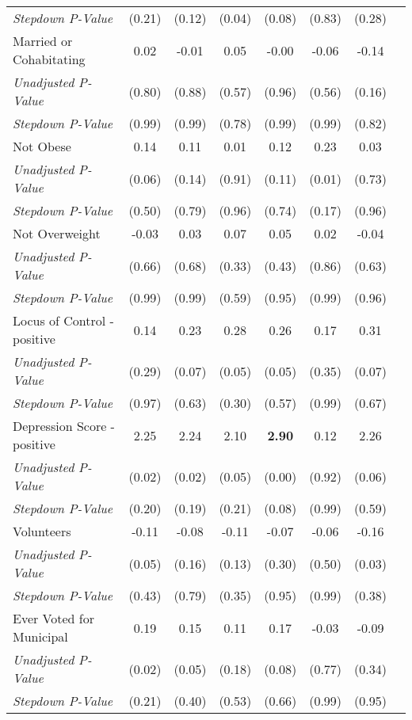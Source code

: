 \begin{tabular}{l c c c c c c c}
\quad \textit{Stepdown P-Value} & (0.21) & (0.12) & (0.04) & (0.08) & (0.83) & (0.28) \\
Married or Cohabitating & 0.02 & -0.01 & 0.05 & -0.00 & -0.06 & -0.14 \\
\quad \textit{Unadjusted P-Value} & (0.80) & (0.88) & (0.57) & (0.96) & (0.56) & (0.16) \\
\quad \textit{Stepdown P-Value} & (0.99) & (0.99) & (0.78) & (0.99) & (0.99) & (0.82) \\
Not Obese & 0.14 & 0.11 & 0.01 & 0.12 & 0.23 & 0.03 \\
\quad \textit{Unadjusted P-Value} & (0.06) & (0.14) & (0.91) & (0.11) & (0.01) & (0.73) \\
\quad \textit{Stepdown P-Value} & (0.50) & (0.79) & (0.96) & (0.74) & (0.17) & (0.96) \\
Not Overweight & -0.03 & 0.03 & 0.07 & 0.05 & 0.02 & -0.04 \\
\quad \textit{Unadjusted P-Value} & (0.66) & (0.68) & (0.33) & (0.43) & (0.86) & (0.63) \\
\quad \textit{Stepdown P-Value} & (0.99) & (0.99) & (0.59) & (0.95) & (0.99) & (0.96) \\
Locus of Control - positive & 0.14 & 0.23 & 0.28 & 0.26 & 0.17 & 0.31 \\
\quad \textit{Unadjusted P-Value} & (0.29) & (0.07) & (0.05) & (0.05) & (0.35) & (0.07) \\
\quad \textit{Stepdown P-Value} & (0.97) & (0.63) & (0.30) & (0.57) & (0.99) & (0.67) \\
Depression Score - positive & 2.25 & 2.24 & 2.10 & \textbf{ 2.90 } & 0.12 & 2.26 \\
\quad \textit{Unadjusted P-Value} & (0.02) & (0.02) & (0.05) & (0.00) & (0.92) & (0.06) \\
\quad \textit{Stepdown P-Value} & (0.20) & (0.19) & (0.21) & (0.08) & (0.99) & (0.59) \\
Volunteers & -0.11 & -0.08 & -0.11 & -0.07 & -0.06 & -0.16 \\
\quad \textit{Unadjusted P-Value} & (0.05) & (0.16) & (0.13) & (0.30) & (0.50) & (0.03) \\
\quad \textit{Stepdown P-Value} & (0.43) & (0.79) & (0.35) & (0.95) & (0.99) & (0.38) \\
Ever Voted for Municipal & 0.19 & 0.15 & 0.11 & 0.17 & -0.03 & -0.09 \\
\quad \textit{Unadjusted P-Value} & (0.02) & (0.05) & (0.18) & (0.08) & (0.77) & (0.34) \\
\quad \textit{Stepdown P-Value} & (0.21) & (0.40) & (0.53) & (0.66) & (0.99) & (0.95) \\

\end{tabular}
